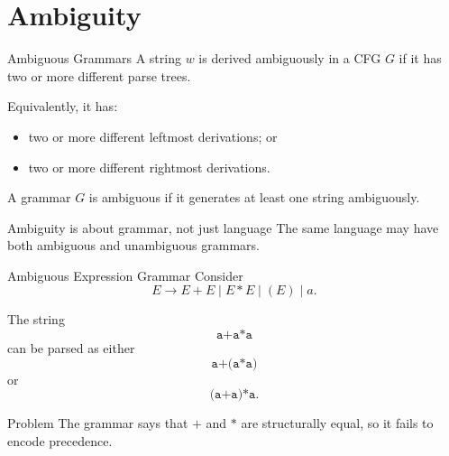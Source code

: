 \documentclass[aspectratio=169,10pt]{beamer}
\newcommand{\code}[1]{\texttt{#1}}
\begin{document}
\section{Ambiguity}

\begin{frame}{Ambiguous Grammars}
\small
A string \(w\) is \alert{derived ambiguously} in a CFG \(G\) if it has two or more different parse trees.

Equivalently, it has:
\begin{itemize}
    \item two or more different leftmost derivations; or
    \item two or more different rightmost derivations.
\end{itemize}

\vspace{0.5em}
A grammar \(G\) is \alert{ambiguous} if it generates at least one string ambiguously.

\begin{alertblock}{Ambiguity is about grammar, not just language}
The same language may have both ambiguous and unambiguous grammars.
\end{alertblock}
\end{frame}

\begin{frame}{Ambiguous Expression Grammar}
\small
Consider
\[
E\to E+E\mid E*E\mid (E)\mid a.
\]

The string
\[
\code{a+a*a}
\]
can be parsed as either
\[
\code{a+(a*a)}
\]
or
\[
\code{(a+a)*a}.
\]

\begin{alertblock}{Problem}
The grammar says that \(+\) and \(*\) are structurally equal, so it fails to encode precedence.
\end{alertblock}
\end{frame}
\end{document}
